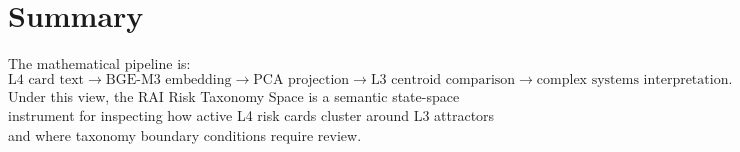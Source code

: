 \documentclass[11pt,a4paper]{article}
\begin{document}
\section{Summary}

The mathematical pipeline is:
\begin{equation}
\text{L4 card text}
\rightarrow
\text{BGE-M3 embedding}
\rightarrow
\text{PCA projection}
\rightarrow
\text{L3 centroid comparison}
\rightarrow
\text{complex systems interpretation}.
\end{equation}
Under this view, the RAI Risk Taxonomy Space is a semantic state-space instrument for inspecting how active L4 risk cards cluster around L3 attractors and where taxonomy boundary conditions require review.
\end{document}
